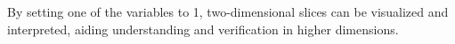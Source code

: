 By setting one of the variables to 1, two-dimensional slices can be visualized and interpreted, aiding understanding and verification in higher dimensions.











